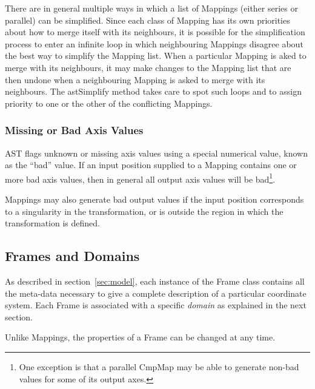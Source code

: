 \documentclass[final,authoryear,5p,times,twocolumn]{elsarticle}
\begin{document}
There are in general multiple ways in which a list of Mappings (either
series or parallel) can be simplified. Since each class of Mapping has
its own priorities about how to merge itself with its neighbours, it is
possible for the simplification process to enter an infinite loop in
which neighbouring Mappings disagree about the best way to simplify the
Mapping list. When a particular Mapping is aked to merge with its
neighbours, it may make changes to the Mapping list that are then undone
when a neighbouring Mapping is asked to merge with its neighbours. The
astSimplify method takes care to spot such loops and to assign priority
to one or the other of the conflicting Mappings.

\subsubsection{Missing or Bad Axis Values}
\label{sec:bad}
AST flags unknown or missing axis values using a special numerical value,
known as the ``bad'' value. If an input position supplied to a Mapping
contains one or more bad axis values, then in general all output axis
values will be bad\footnote{One exception is that a parallel CmpMap may
be able to generate non-bad values for some of its output axes.}.

Mappings may also generate bad output values if the input position
corresponds to a singularity in the transformation, or is outside the
region in which the transformation is defined.

\subsection{Frames and Domains}
As described in section~\ref{sec:model}, each instance of the Frame class
contains all the meta-data necessary to give a complete description of
a particular coordinate system. Each Frame is associated with a specific
\emph{domain} as explained in the next section.

Unlike Mappings, the properties of a Frame can be changed at any time.
\end{document}
